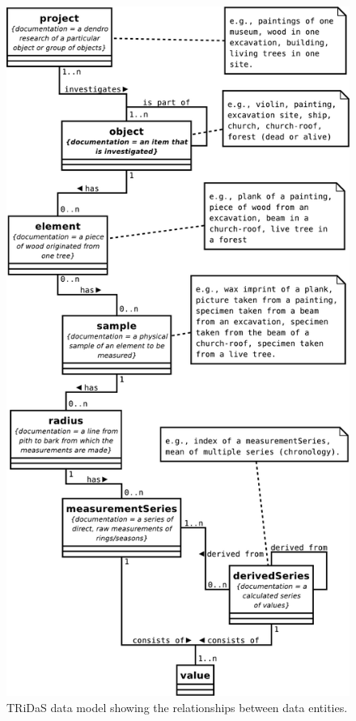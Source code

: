 \begin{figure}
\centering
\includegraphics[height=0.9\textheight]{Images/datamodel.pdf}
\caption{TRiDaS data model showing the relationships between data entities.} 
\label{fig:datamodel}
\end{figure}

